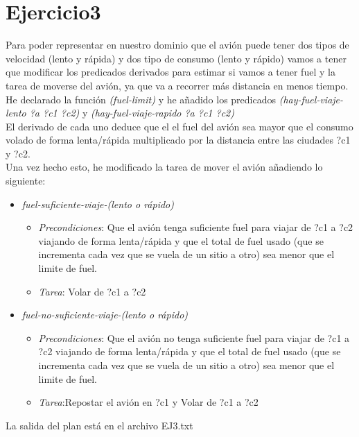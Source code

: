 \documentclass[10pt,spanish]{article}
\begin{document}
	\section{Ejercicio3}
	Para poder representar en nuestro dominio que el avión puede tener dos tipos de velocidad (lento y rápida) y dos tipo de consumo (lento y rápido) vamos a tener que modificar los predicados derivados para estimar si vamos a tener fuel y la tarea de moverse del avión, ya que va a recorrer más distancia en menos tiempo.\\
	He declarado la función \textit{(fuel-limit)} y he añadido los predicados \textit{(hay-fuel-viaje-lento ?a ?c1 ?c2)} y \textit{(hay-fuel-viaje-rapido ?a ?c1 ?c2)}\\
	El derivado de cada uno deduce que el el fuel del avión  sea mayor que el consumo volado de forma lenta/rápida multiplicado por la distancia entre las ciudades ?c1 y ?c2.\\
	Una vez hecho esto, he modificado la tarea de mover el avión añadiendo lo siguiente:
	\begin{itemize}
		\item \textit{fuel-suficiente-viaje-(lento o rápido)}
		\begin{itemize}
			\item \textit{Precondiciones}: Que el avión tenga suficiente fuel para viajar de ?c1 a ?c2 viajando de forma lenta/rápida y que el total de fuel usado (que se incrementa cada vez que se vuela de un sitio a otro) sea menor que el limite de fuel. 
			\item \textit{Tarea}: Volar de ?c1 a ?c2
		\end{itemize}
		\item \textit{fuel-no-suficiente-viaje-(lento o rápido)}
		\begin{itemize}
			\item \textit{Precondiciones}: Que el avión no tenga suficiente fuel para viajar de ?c1 a ?c2 viajando de forma lenta/rápida y que el total de fuel usado (que se incrementa cada vez que se vuela de un sitio a otro) sea menor que el limite de fuel. 
			\item \textit{Tarea}:Repostar el avión en ?c1 y Volar de ?c1 a ?c2
		\end{itemize}
	\end{itemize}
	La salida del plan está en el archivo EJ3.txt
\end{document}
